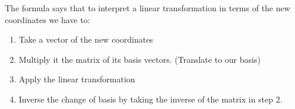 The formula says that to interpret a linear transformation in terms of the
new coordinates we have to:

\begin{enumerate}
    \item Take a vector of the new coordinates
    \item Multiply it the matrix of its basis vectors. (Translate to our basis)
    \item Apply the linear transformation
    \item Inverse the change of basis by taking the inverse of the 
    matrix in step 2.
\end{enumerate}
